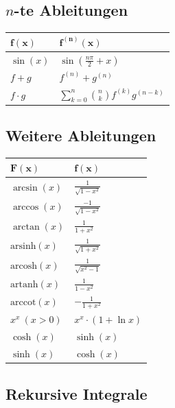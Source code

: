 \documentclass[a4paper,10pt]{article}
\begin{document}
\subsection{$n$-te Ableitungen}
\begin{center}
  \begin{tabularx}{\linewidth}{>{\centering\arraybackslash}X>{\centering\arraybackslash}X}
  \toprule
  $\mathbf{f(x)}$ & $\mathbf{f^{(n)}(x)}$ \\
  \midrule
  $\sin(x)$ & $\sin(\frac{n\pi}{2} + x)$\\
  $f + g$ & $f^{(n)} + g^{(n)}$\\
  $f \cdot g$ & $\sum\limits_{k=0}^{n}\binom{n}{k}f^{(k)}g^{(n-k)}$\\
  \bottomrule
  \end{tabularx}
\end{center}

\subsection{Weitere Ableitungen}
\begin{center}
  \begin{tabularx}{\linewidth}{>{\centering\arraybackslash}X>{\centering\arraybackslash}X}
  \toprule
  $\mathbf{F(x)}$ & $\mathbf{f(x)}$ \\
  \midrule
  $\arcsin(x)$ & $\frac{1}{\sqrt{1 - x^2}}$ \\
  $\arccos(x)$ & $\frac{-1}{\sqrt{1 - x^2}}$ \\
  $\arctan(x)$ & $\frac{1}{1 + x^2}$ \\ 
  $\text{arsinh}(x)$ & $\frac{1}{\sqrt{1 + x^2}}$ \\
  $\text{arcosh}(x)$ & $\frac{1}{\sqrt{x^2 - 1}}$ \\
  $\text{artanh}(x)$ & $\frac{1}{1 - x^2}$ \\
  $\text{arccot}(x)$ & $-\frac{1}{1 + x^2}$ \\
  $x^x \ (x > 0)$ & $x^x \cdot (1 + \ln x)$ \\
  $\cosh(x)$ & $\sinh(x)$ \\
  $\sinh(x)$ & $\cosh(x)$ \\
  \bottomrule
  \end{tabularx}
\end{center}

\subsection{Rekursive Integrale}
\end{document}
